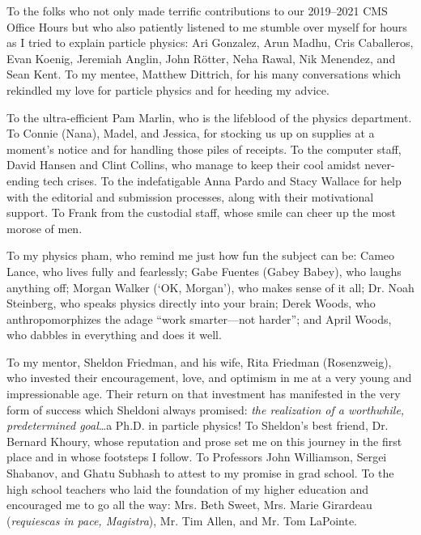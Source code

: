 To the folks who not only made terrific contributions to our 2019--2021 CMS Office Hours but who also patiently listened to me stumble over myself for hours as I tried to explain particle physics:
Ari Gonzalez, Arun Madhu, Cris Caballeros, Evan Koenig, Jeremiah Anglin, John Rötter, Neha Rawal, Nik Menendez, and Sean Kent.
To my mentee, Matthew Dittrich, for his many conversations which rekindled my love for particle physics and for heeding my advice.

To the ultra-efficient Pam Marlin, who is the lifeblood of the physics department.
To Connie (Nana), Madel, and Jessica, for stocking us up on supplies at a moment's notice and for handling those piles of receipts.
To the computer staff, David Hansen and Clint Collins, who manage to keep their cool amidst never-ending tech crises.
To the indefatigable Anna Pardo and Stacy Wallace for help with the editorial and submission processes, along with their motivational support.
To Frank from the custodial staff, whose smile can cheer up the most morose of men.

To my physics pham, who remind me just how fun the subject can be:
Cameo Lance, who lives fully and fearlessly;
Gabe Fuentes (Gabey Babey), who laughs anything off;
Morgan Walker (`OK, Morgan'), who makes sense of it all;
Dr. Noah Steinberg, who speaks physics directly into your brain;
Derek Woods, who anthropomorphizes the adage ``work smarter---not harder'';
and April Woods, who dabbles in everything and does it well.

To my mentor, Sheldon Friedman, and his wife, Rita Friedman (Rosenzweig), who invested their encouragement, love, and optimism in me at a very young and impressionable age.
Their return on that investment has manifested in the very form of success which Sheldoni always promised: \emph{the realization of a worthwhile, predetermined goal}\ldots a Ph.D. in particle physics!
To Sheldon's best friend, Dr. Bernard Khoury, whose reputation and prose set me on this journey in the first place and in whose footsteps I follow.
To Professors John Williamson, Sergei Shabanov, and Ghatu Subhash to attest to my promise in grad school.
To the high school teachers who laid the foundation of my higher education and encouraged me to go all the way: Mrs. Beth Sweet, Mrs. Marie Girardeau (\emph{requiescas in pace, Magistra}),  Mr. Tim Allen, and Mr. Tom LaPointe.

